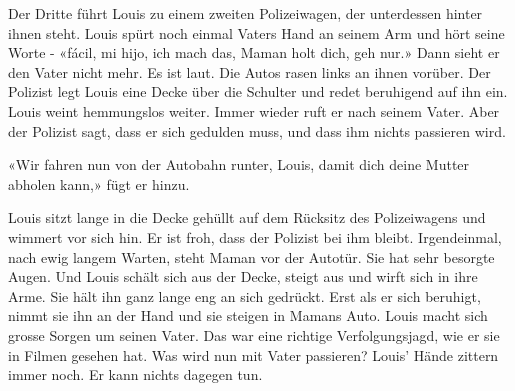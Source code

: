 {Der Dritte führt Louis zu einem zweiten Polizeiwagen, der unterdessen hinter ihnen steht. Louis spürt  noch einmal Vaters Hand an seinem Arm und hört seine Worte - «fácil, mi hijo, ich mach das, Maman holt dich, geh nur.»
Dann sieht er den Vater nicht mehr. Es ist laut. Die Autos rasen links an ihnen vorüber. Der Polizist legt Louis
eine Decke über die Schulter und redet beruhigend auf ihn ein. Louis 
weint hemmungslos weiter.
Immer wieder ruft er nach seinem Vater. Aber der Polizist sagt, dass er
sich gedulden muss, und dass ihm nichts passieren wird. 

«Wir fahren nun von der Autobahn runter, Louis, damit dich deine Mutter 
abholen kann,» fügt er hinzu.

Louis sitzt lange in die Decke gehüllt auf dem Rücksitz des Polizeiwagens und wimmert vor sich hin. 
Er ist froh, dass der Polizist bei ihm bleibt. 
Irgendeinmal, nach ewig langem Warten, steht Maman vor der Autotür. Sie
hat sehr besorgte Augen. Und Louis schält sich aus der Decke, steigt aus
und wirft sich in ihre Arme. Sie hält ihn ganz lange eng an sich
gedrückt. Erst als er sich beruhigt, nimmt sie ihn an der Hand und sie
steigen in Mamans Auto. Louis macht sich grosse Sorgen um seinen Vater.
Das war eine richtige Verfolgungsjagd, wie er sie in Filmen gesehen hat.
Was wird nun mit Vater passieren? Louis’ Hände zittern immer noch. Er
kann nichts dagegen tun.}

